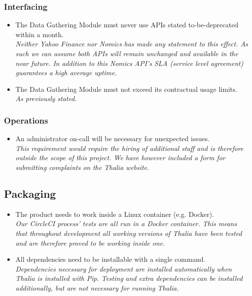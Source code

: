 \documentclass[main.tex]{subfiles}
\begin{document}
\subsubsection{Interfacing}
\begin{itemize}

\item The Data Gathering Module must never use APIs stated to-be-deprecated within a month.\\
\textit{Neither Yahoo Finance nor Nomics has made any statement to this effect. As such we can assume both APIs will remain unchanged and available in the near future. In addition to this Nomics API’s SLA (service level agreement) guarantees a high average uptime\cite{nomicsAPISpec}.}
\item The Data Gathering Module must not exceed its contractual usage limits.\\
\textit{As previously stated.}

\end{itemize}

\subsubsection{Operations}
\begin{itemize}

\item An administrator on-call will be necessary for unexpected issues.\\
\textit{This requirement would require the hiring of additional staff and is therefore outside the scope of this project. We have however included a form for submitting complaints on the Thalia website.}

\end{itemize}

\subsection{Packaging}
\begin{itemize}
\item The product needs to work inside a Linux container (e.g. Docker).\\
\textit{Our CircleCI process’ tests are all run in a Docker container. This means that throughout development all working versions of Thalia have been tested and are therefore proved to be working inside one.}
\item All dependencies need to be installable with a single command.\\
\textit{Dependencies necessary for deployment are installed automatically when Thalia is installed with Pip. Testing and extra dependencies can be installed additionally, but are not necessary for running Thalia.}
\end{itemize}
\end{document}
